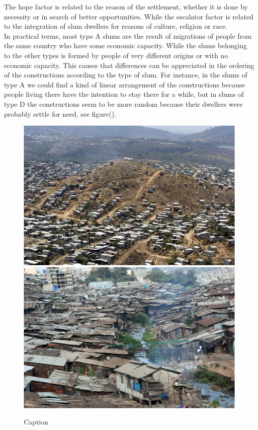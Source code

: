 \documentclass[10pt]{article}
\begin{document}
The hope factor is related to the reason of the settlement, whether it is done by necessity or in search of better opportunities. While the escalator factor is related to the integration of slum dwellers for reasons of culture, religion or race.\\

In practical terms, most type A slums are the result of migrations of people from the same country who have some economic capacity. While the slums belonging to the other types is formed by people of very different origins or with no economic capacity. This causes that differences can be appreciated in the ordering of the constructions according to the type of slum. For instance, in the slums of type A we could find a kind of linear arrangement of the constructions because people living there have the intention to stay there for a while, but in slums of type D the constructions seem to be more random because their dwellers were probably settle for need, see figure().\\ 

\begin{figure}[h]
    \centering
    \includegraphics[scale = 0.32]{images/slum_a}
    \includegraphics[scale = 0.205]{images/slum_d}
    \caption{Caption}
    \label{fig:my_label}
\end{figure}
\end{document}
